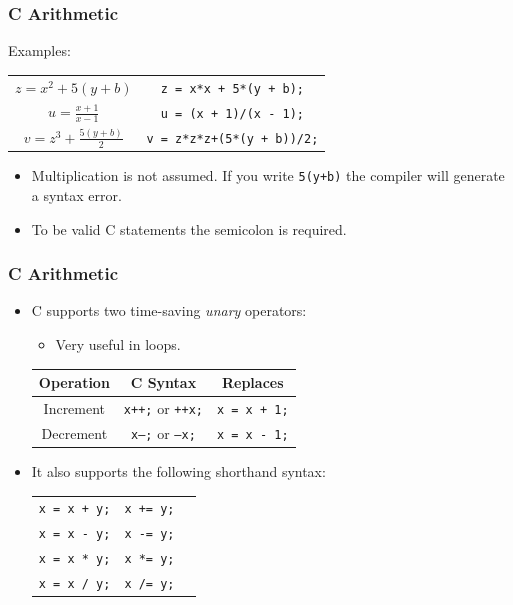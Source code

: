 \documentclass[14pt]{beamer}
\begin{document}
\begin{frame}
\frametitle{C Arithmetic}
Examples:
\begin{small}
\begin{table}
\centering
\begin{tabular}{cc}
\vspace{2mm}
$z = x^2 + 5(y + b)$ & \texttt{z = x*x + 5*(y + b);} \\
\vspace{2mm}
$u = \frac{x + 1}{x - 1}$ & \texttt{u = (x + 1)/(x - 1);} \\
$v = z^3 + \frac{5(y + b)}{2}$ & \texttt{v = z*z*z+(5*(y + b))/2;} \\
\end{tabular}
\end{table}
\end{small}

\begin{itemize}
\item Multiplication is not assumed. If you write \texttt{5(y+b)} the compiler will generate a syntax error.
\item To be valid C statements the semicolon is required.
\end{itemize}
\end{frame}

\begin{frame}
\frametitle{C Arithmetic}
\begin{itemize}
\item C supports two time-saving \textit{unary} operators:
\begin{itemize}
\item Very useful in loops.
\end{itemize}

\begin{table}
\centering
\begin{tabular}{|c|c|c|}
\hline
Operation & C Syntax & Replaces\\
\hline
Increment & \texttt{x++;} or \texttt{++x;} & \texttt{x = x + 1;} \\
Decrement & \texttt{x--;} or \texttt{--x;} & \texttt{x = x - 1;} \\
\hline
\end{tabular}
\end{table}

\item It also supports the following shorthand syntax:

\begin{table}
\centering
\begin{tabular}{|c|c|c|}
\hline
\texttt{x = x + y;} & \texttt{x += y;} \\
\texttt{x = x - y;} & \texttt{x -= y;} \\
\texttt{x = x * y;} & \texttt{x *= y;} \\
\texttt{x = x / y;} & \texttt{x /= y;} \\
\hline
\end{tabular}
\end{table}
\end{itemize}
\end{frame}
\end{document}
